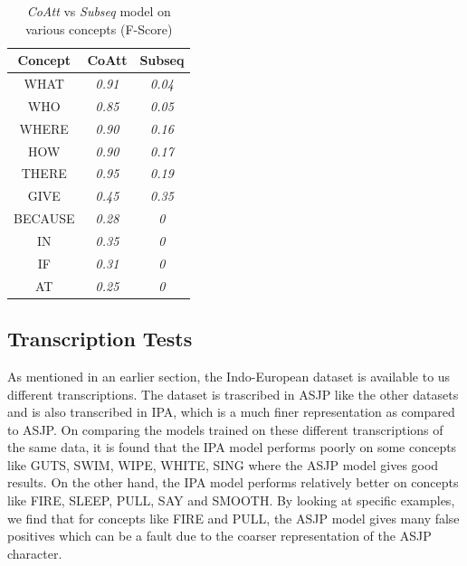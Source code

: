 \documentclass[11pt,letterpaper]{article}
\begin{document}
\begin{table}[h]
\centering
\begin{tabular}{ccc}
\textbf{Concept} & \textbf{CoAtt} & \textbf{Subseq} \\ \hline
WHAT             & \textit{0.91}  & \textit{0.04}   \\
WHO              & \textit{0.85}  & \textit{0.05}   \\
WHERE            & \textit{0.90}  & \textit{0.16}   \\
HOW              & \textit{0.90}  & \textit{0.17}   \\
THERE            & \textit{0.95}  & \textit{0.19}  \\
GIVE             & \textit{0.45}  & \textit{0.35}  \\
BECAUSE          & \textit{0.28}  & \textit{0}      \\
IN               & \textit{0.35}  & \textit{0}      \\
IF               & \textit{0.31}  & \textit{0}      \\
AT               & \textit{0.25}  & \textit{0}      
\end{tabular}
\caption{\textit{CoAtt} vs \textit{Subseq} model on various concepts (F-Score)}
\end{table}

\subsection{Transcription Tests}

As mentioned in an earlier section, the Indo-European dataset is available to us different transcriptions. The dataset is trascribed in ASJP like the other datasets and is also transcribed in IPA, which is a much finer representation as compared to ASJP. On comparing the models trained on these different transcriptions of the same data, it is found that the IPA model performs poorly on some concepts like GUTS, SWIM, WIPE, WHITE, SING where the ASJP model gives good results. On the other hand, the IPA model performs relatively better on concepts like FIRE, SLEEP, PULL, SAY and SMOOTH. By looking at specific examples, we find that for concepts like FIRE and PULL, the ASJP model gives many false positives which can be a fault due to the coarser representation of the ASJP character.
\end{document}
